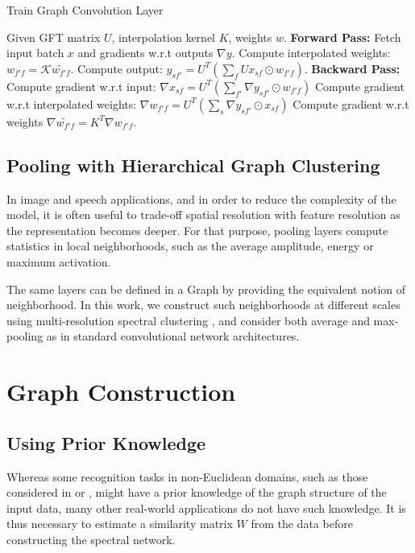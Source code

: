 \documentclass{article} %
\begin{document}
\begin{algorithm}
\caption{Train Graph Convolution Layer}
\label{pseudoPSO}
\begin{algorithmic}[1]
\State Given GFT matrix $U$, interpolation kernel $K$, weights $w$. 
\State \textbf{Forward Pass:}
  \State Fetch input batch $x$ and gradients w.r.t outputs $\nabla y$.
  \State Compute interpolated weights: $w_{f'f} = \mathcal{K} \tilde{w_{f'f}}$.
  \State Compute output: $y_{sf'} = U^T\left(\sum_{f} Ux_{sf} \odot w_{f'f} \right)$.
  \State \textbf{Backward Pass:}
  \State Compute gradient w.r.t input: $\nabla x_{sf} = U^T\left(\sum_{f'} \nabla y_{sf'} \odot w_{f'f} \right)$
  \State Compute gradient w.r.t interpolated weights: $\nabla w_{f'f} = U^T\left(\sum_s \nabla y_{sf'} \odot x_{sf} \right)$
  \State Compute gradient w.r.t weights $\nabla \tilde{w_{f'f}} = K^T \nabla w_{f'f}$.
\end{algorithmic}
\end{algorithm}

\subsection{Pooling with Hierarchical Graph Clustering}

In image and speech applications, and in order to reduce the complexity of the model, it is often useful to trade-off spatial resolution with feature resolution as the representation becomes deeper. For that purpose, pooling layers compute statistics in local neighborhoods, such as the average amplitude, energy or maximum activation.

The same layers can be defined in a Graph by providing the equivalent notion of neighborhood. In this work, we construct such neighborhoods at different scales using multi-resolution spectral clustering \cite{von2007tutorial}, and consider both average and max-pooling as in standard convolutional network architectures.

\section{ Graph Construction }
\label{graphestimsect}

\subsection{ Using Prior Knowledge}

Whereas some recognition tasks in non-Euclidean domains, such as those considered in \cite{spectralnet2013} or \cite{DBLP:journals/corr/MasciBBV15}, might have a prior knowledge of the graph structure of the input data, many other real-world applications do not have such knowledge. It is thus necessary to estimate a similarity matrix $W$ from the data before constructing the spectral network. 
\end{document}

